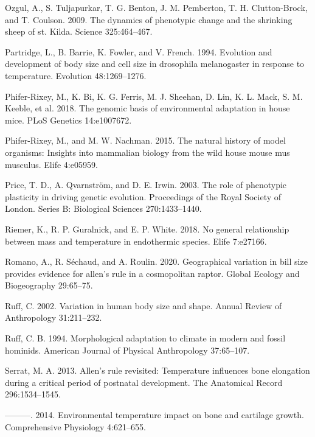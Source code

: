 \documentclass[]{article}
\begin{document}
\leavevmode\hypertarget{ref-Ozgul2009}{}%
Ozgul, A., S. Tuljapurkar, T. G. Benton, J. M. Pemberton, T. H.
Clutton-Brock, and T. Coulson. 2009. The dynamics of phenotypic change
and the shrinking sheep of st. Kilda. Science 325:464--467.

\leavevmode\hypertarget{ref-Partridge1994}{}%
Partridge, L., B. Barrie, K. Fowler, and V. French. 1994. Evolution and
development of body size and cell size in drosophila melanogaster in
response to temperature. Evolution 48:1269--1276.

\leavevmode\hypertarget{ref-Phifer-Rixey2018}{}%
Phifer-Rixey, M., K. Bi, K. G. Ferris, M. J. Sheehan, D. Lin, K. L.
Mack, S. M. Keeble, et al. 2018. The genomic basis of environmental
adaptation in house mice. PLoS Genetics 14:e1007672.

\leavevmode\hypertarget{ref-Phifer-Rixey2015}{}%
Phifer-Rixey, M., and M. W. Nachman. 2015. The natural history of model
organisms: Insights into mammalian biology from the wild house mouse mus
musculus. Elife 4:e05959.

\leavevmode\hypertarget{ref-Price2003}{}%
Price, T. D., A. Qvarnström, and D. E. Irwin. 2003. The role of
phenotypic plasticity in driving genetic evolution. Proceedings of the
Royal Society of London. Series B: Biological Sciences 270:1433--1440.

\leavevmode\hypertarget{ref-Riemer2018}{}%
Riemer, K., R. P. Guralnick, and E. P. White. 2018. No general
relationship between mass and temperature in endothermic species. Elife
7:e27166.

\leavevmode\hypertarget{ref-Romano2020}{}%
Romano, A., R. Séchaud, and A. Roulin. 2020. Geographical variation in
bill size provides evidence for allen's rule in a cosmopolitan raptor.
Global Ecology and Biogeography 29:65--75.

\leavevmode\hypertarget{ref-Ruff2002}{}%
Ruff, C. 2002. Variation in human body size and shape. Annual Review of
Anthropology 31:211--232.

\leavevmode\hypertarget{ref-Ruff1994}{}%
Ruff, C. B. 1994. Morphological adaptation to climate in modern and
fossil hominids. American Journal of Physical Anthropology 37:65--107.

\leavevmode\hypertarget{ref-Serrat2013}{}%
Serrat, M. A. 2013. Allen's rule revisited: Temperature influences bone
elongation during a critical period of postnatal development. The
Anatomical Record 296:1534--1545.

\leavevmode\hypertarget{ref-Serrat2014}{}%
---------. 2014. Environmental temperature impact on bone and cartilage
growth. Comprehensive Physiology 4:621--655.
\end{document}

